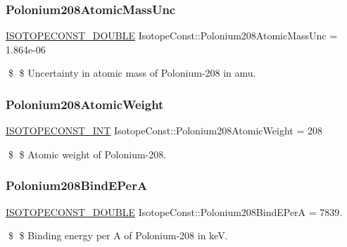 \subsubsection{\texorpdfstring{Polonium208\+Atomic\+Mass\+Unc}{Polonium208AtomicMassUnc}}
{\footnotesize\ttfamily \mbox{\hyperlink{group___isotope_const-_macros_ga8f45a7272ce02c0b4c65c44636ed719a}{I\+S\+O\+T\+O\+P\+E\+C\+O\+N\+S\+T\+\_\+\+D\+O\+U\+B\+LE}} Isotope\+Const\+::\+Polonium208\+Atomic\+Mass\+Unc = 1.\+864e-\/06}

\$ \$ Uncertainty in atomic mass of Polonium-\/208 in amu. \mbox{\label{group___isotope_const-_polonium-_po208_gad11a6bf74790259ce008fa529bb3d7e1}} 
\subsubsection{\texorpdfstring{Polonium208\+Atomic\+Weight}{Polonium208AtomicWeight}}
{\footnotesize\ttfamily \mbox{\hyperlink{group___isotope_const-_macros_ga5f18360b3e99483a35c32d789e62621c}{I\+S\+O\+T\+O\+P\+E\+C\+O\+N\+S\+T\+\_\+\+I\+NT}} Isotope\+Const\+::\+Polonium208\+Atomic\+Weight = 208}

\$ \$ Atomic weight of Polonium-\/208. \mbox{\label{group___isotope_const-_polonium-_po208_ga1ad0b19437e8099ac7565dec01a1b500}} 
\subsubsection{\texorpdfstring{Polonium208\+Bind\+E\+PerA}{Polonium208BindEPerA}}
{\footnotesize\ttfamily \mbox{\hyperlink{group___isotope_const-_macros_ga8f45a7272ce02c0b4c65c44636ed719a}{I\+S\+O\+T\+O\+P\+E\+C\+O\+N\+S\+T\+\_\+\+D\+O\+U\+B\+LE}} Isotope\+Const\+::\+Polonium208\+Bind\+E\+PerA = 7839.}

\$ \$ Binding energy per A of Polonium-\/208 in keV. \mbox{\label{group___isotope_const-_polonium-_po208_ga82e5998d05b1b47b21182eeb2b2ef7ab}} 
